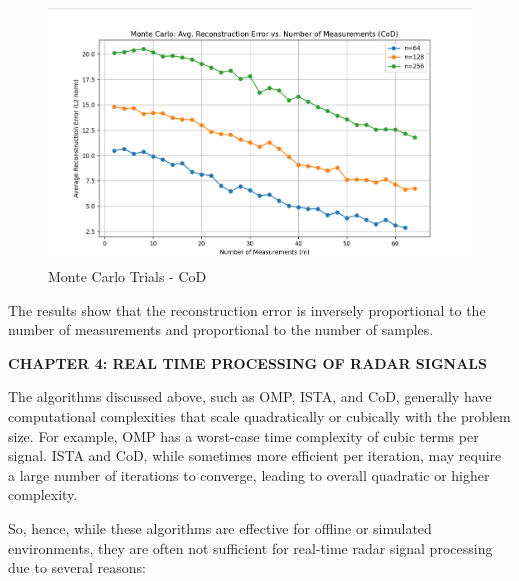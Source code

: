 \documentclass[
  letterpaper,
  DIV=11,
  numbers=noendperiod]{scrartcl}
\providecommand{\mainsection}[1]{\begin{center}{\rmfamily\textbf{\fontsize{14}{20}\selectfont #1}}\end{center}}
\begin{document}
\begin{figure}[H]

{\centering \includegraphics[width=0.8\linewidth,height=\textheight,keepaspectratio]{abar-cs_files/mediabag/montecarlo_CoD.png}

}

\caption{Monte Carlo Trials - CoD}

\end{figure}%

The results show that the reconstruction error is inversely proportional
to the number of measurements and proportional to the number of samples.

\newpage

\mainsection{CHAPTER 4: REAL TIME PROCESSING OF RADAR SIGNALS}

The algorithms discussed above, such as OMP, ISTA, and CoD, generally
have computational complexities that scale quadratically or cubically
with the problem size. For example, OMP has a worst-case time complexity
of cubic terms per signal. ISTA and CoD, while sometimes more efficient
per iteration, may require a large number of iterations to converge,
leading to overall quadratic or higher complexity.

So, hence, while these algorithms are effective for offline or simulated
environments, they are often not sufficient for real-time radar signal
processing due to several reasons:
\end{document}
